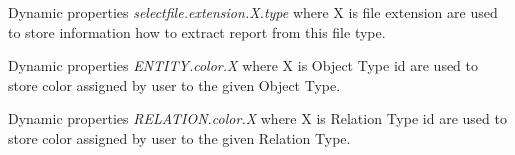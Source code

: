 Dynamic properties \emph{selectfile.extension.X.type} where X is file extension
are used to store information how to extract report from this file type.

Dynamic properties \emph{ENTITY.color.X} where X is Object Type id are used to
store color assigned by user to the given Object Type.

Dynamic properties \emph{RELATION.color.X} where X is Relation Type id are used
to store color assigned by user to the given Relation Type.
